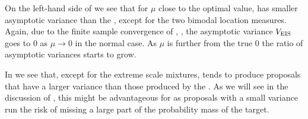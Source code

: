 On the left-hand side of  we see that for $\mu$ close to the optimal value, \aeis has smaller asymptotic variance than the \acem, except for the two bimodal location measures. Again, due to the finite sample convergence of \aeis, , the asymptotic variance $V_{{\text{EIS}}}$ goes to $0$ as $\mu \to 0$ in the normal case. As $\mu$ is further from the true $0$ the ratio of asymptotic variances starts to grow. 

In  we see that, except for the extreme scale mixtures, \aeis tends to produce proposals that have a larger variance than those produced by the \acem. As we will see in the discussion of , this might be advantageous for \aeis as proposals with a small variance run the risk of missing a large part of the probability mass of the target. 

